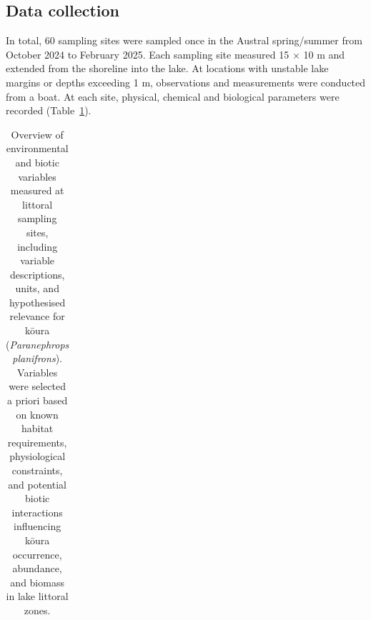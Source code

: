 \documentclass[
  12pt,
  a4paper,
  oneside]{scrbook}
\begin{document}
\subsection{Data collection}\label{data-collection}

In total, 60 sampling sites were sampled once in the Austral
spring/summer from October 2024 to February 2025. Each sampling site
measured 15 × 10 m and extended from the shoreline into the lake. At
locations with unstable lake margins or depths exceeding 1 m,
observations and measurements were conducted from a boat. At each site,
physical, chemical and biological parameters were recorded
(Table~\ref{tbl-environmental-biotic-overview}).

\begin{landscape}
\begingroup\fontsize{7}{9}\selectfont

\begin{longtable}[t]{>{\raggedright\arraybackslash}p{2.5cm}>{\raggedright\arraybackslash}p{3.5cm}>{\raggedright\arraybackslash}p{9.5cm}>{\raggedright\arraybackslash}p{5.0cm}}

\caption{\label{tbl-environmental-biotic-overview}Overview of
environmental and biotic variables measured at littoral sampling sites,
including variable descriptions, units, and hypothesised relevance for
kōura (\emph{Paranephrops planifrons}). Variables were selected a priori
based on known habitat requirements, physiological constraints, and
potential biotic interactions influencing kōura occurrence, abundance,
and biomass in lake littoral zones.}

\tabularnewline


\end{longtable}
\end{landscape}
\end{document}
